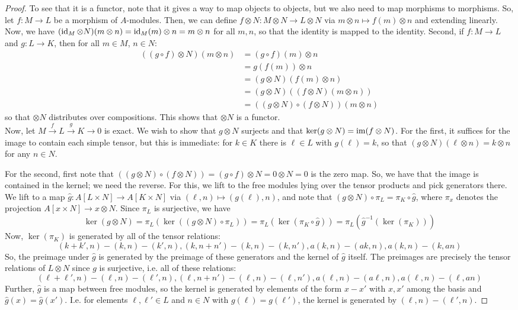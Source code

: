 \documentclass[12pt]{exam}
\begin{document}
\begin{proof}
	To see that it is a functor, note that it gives a way to map objects to objects, but we also need to map morphisms to morphisms. So, let $f : M \to L$ be a morphism of $A$-modules. Then, we can define $f \otimes N : M \otimes N \to L \otimes N$ via $m \otimes n \mapsto f(m) \otimes n$ and extending linearly. Now, we have $(\operatorname{id}_M \otimes N)(m \otimes n) = \operatorname{id}_M(m) \otimes n = m \otimes n$ for all $m,n$, so that the identity is mapped to the identity. Second, if $f : M \to L$ and $g : L \to K$, then for all $m \in M$, $n \in N$:
	\begin{align*}
	((g \circ f) \otimes N)(m \otimes n)
		&= (g \circ f)(m) \otimes n \\
		&= g(f(m)) \otimes n \\
		&= (g \otimes N)(f(m) \otimes n) \\
		&= (g \otimes N)((f \otimes N)(m \otimes n)) \\
		&= ((g \otimes N) \circ (f \otimes N))(m \otimes n)
	\end{align*}
	so that $\otimes N$ distributes over compositions. This shows that $\otimes N$ is a functor. \\
	
	Now, let $M \xrightarrow{f} L \xrightarrow{g} K \to 0$ is exact. We wish to show that $g \otimes N$ surjects and that $\ker(g \otimes N) = \operatorname{im}(f \otimes N)$. For the first, it suffices for the image to contain each simple tensor, but this is immediate: for $k \in K$ there is $\ell \in L$ with $g(\ell) = k$, so that $(g \otimes N)(\ell \otimes n) = k \otimes n$ for any $n \in N$.
	
	For the second, first note that $((g \otimes N) \circ (f \otimes N)) = (g \circ f) \otimes N = 0 \otimes N = 0$ is the zero map. So, we have that the image is contained in the kernel; we need the reverse. For this, we lift to the free modules lying over the tensor products and pick generators there. We lift to a map $\hat{g} : A[L \times N] \to A[K \times N]$ via $(\ell,n) \mapsto (g(\ell), n)$, and note that $(g \otimes N) \circ \pi_L = \pi_K \circ \hat{g}$, where $\pi_x$ denotes the projection $A[x \times N] \to x \otimes N$. Since $\pi_L$ is surjective, we have
	\[ \ker(g \otimes N) = \pi_L(\ker((g \otimes N) \circ \pi_L)) = \pi_L(\ker(\pi_K \circ \hat{g})) = \pi_L(\hat{g}^{-1}(\ker(\pi_K))) \]
	Now, $\ker(\pi_K)$ is generated by all of the tensor relations:
	\[ (k+k',n)-(k,n)-(k',n), (k,n+n')-(k,n)-(k,n'), a(k,n)-(ak,n), a(k,n)-(k,an) \]
	So, the preimage under $\hat{g}$ is generated by the preimage of these generators and the kernel of $\hat{g}$ itself. The preimages are precisely the tensor relations of $L \otimes N$ since $g$ is surjective, i.e. all of these relations:
	\[ (\ell+\ell',n)-(\ell,n)-(\ell',n), (\ell,n+n')-(\ell,n)-(\ell,n'), a(\ell,n)-(a\ell,n), a(\ell,n)-(\ell,an) \]
	Further, $\hat{g}$ is a map between free modules, so the kernel is generated by elements of the form $x-x'$ with $x,x'$ among the basis and $\hat{g}(x)=\hat{g}(x')$. I.e. for elements $\ell,\ell' \in L$ and $n \in N$ with $g(\ell)=g(\ell')$, the kernel is generated by $(\ell,n)-(\ell',n)$.
	

\end{proof}
\end{document}
